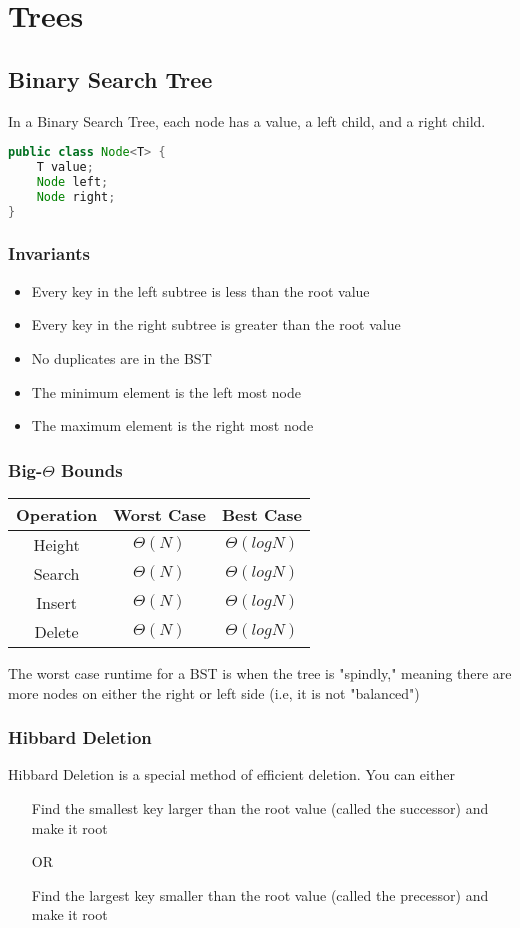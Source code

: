 \documentclass{article}
\begin{document}
\section{Trees}
\subsection{Binary Search Tree}
In a Binary Search Tree, each node has a value, a left child, and a right child.
\begin{lstlisting}[language=Java]
public class Node<T> {
    T value;
    Node left;
    Node right;
}
\end{lstlisting}
\subsubsection{Invariants}
\begin{itemize}
    \item Every key in the left subtree is less than the root value
    \item Every key in the right subtree is greater than the root value
    \item No duplicates are in the BST
    \item The minimum element is the left most node
    \item The maximum element is the right most node
\end{itemize}
\subsubsection{Big-$\Theta$ Bounds}
\begin{center}
    \begin{tabular}{ c | c | c }
     Operation & Worst Case & Best Case\\
     \hline
     Height & $\Theta(N)$ & $\Theta(log N)$ \\ 
     Search & $\Theta(N)$ & $\Theta(log N)$ \\  
     Insert & $\Theta(N)$ & $\Theta(log N)$ \\
     Delete & $\Theta(N)$ & $\Theta(log N)$    
    \end{tabular}
\end{center}
The worst case runtime for a BST is when the tree is "spindly," meaning there are more nodes on either the right or left side (i.e, it is not "balanced")
\subsubsection{Hibbard Deletion}
Hibbard Deletion is a special method of efficient deletion.
You can either
\begin{itemize}
    \item[] Find the smallest key larger than the root value (called the successor) and make it root
    \item[OR ] 
    \item[] Find the largest key smaller than the root value (called the precessor) and make it root
\end{itemize}
\end{document}

